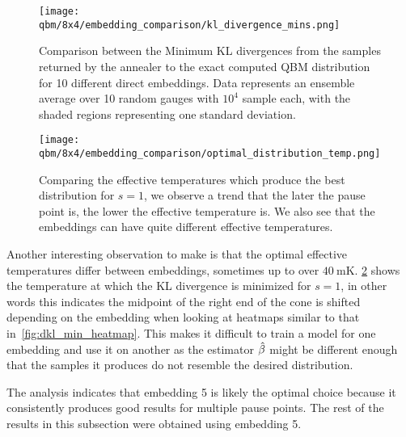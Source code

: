 \begin{figure}[!htb]
    \begin{center}
        \texttt{[image: qbm/8x4/embedding\_comparison/kl\_divergence\_mins.png]}
    \end{center}
    \caption{Comparison between the Minimum KL divergences from the samples returned by the annealer to the exact computed QBM distribution for 10 different direct embeddings. Data represents an ensemble average over 10 random gauges with \( 10^4 \) sample each, with the shaded regions representing one standard deviation.}
    \label{fig:dkl_mins_embeddings}
\end{figure}

\begin{figure}[!htb]
    \begin{center}
        \texttt{[image: qbm/8x4/embedding\_comparison/optimal\_distribution\_temp.png]}
    \end{center}
    \caption{Comparing the effective temperatures which produce the best distribution for \( s = 1 \), we observe a trend that the later the pause point is, the lower the effective temperature is. We also see that the embeddings can have quite different effective temperatures.}
    \label{fig:optimal_distribution_temp}
\end{figure}

Another interesting observation to make is that the optimal effective temperatures differ between embeddings, sometimes up to over \( 40 \ \si{\milli\kelvin} \).
\cref{fig:optimal_distribution_temp} shows the temperature at which the KL divergence is minimized for \( s = 1 \), in other words this indicates the midpoint of the right end of the cone is shifted depending on the embedding when looking at heatmaps similar to that in~\cref{fig:dkl_min_heatmap}.
This makes it difficult to train a model for one embedding and use it on another as the estimator \( \hat{\beta} \) might be different enough that the samples it produces do not resemble the desired distribution.

The analysis indicates that embedding 5 is likely the optimal choice because it consistently produces good results for multiple pause points.
The rest of the results in this subsection were obtained using embedding 5.

